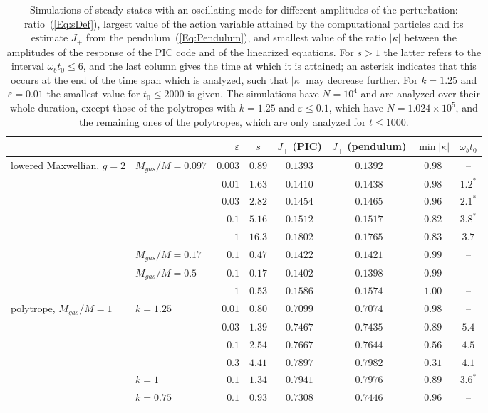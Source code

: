 \begin{table}[htp]
\begin{center}
\begin{tabular}{ll|rc|cc|cc}
\hline\hline
 & & $\varepsilon$ & $s$ & $J_+$ (PIC) & $J_+$ (pendulum) & $\min|\kappa|$ & $\omega_b t_0$ \\
\hline
lowered Maxwellian, $g = 2$ & $M_{gas}/M = 0.097$ & $0.003$ & $0.89$ & $0.1393$ & $0.1392$ & $0.98$ & -- \\
 & & $0.01$ & $1.63$ & $0.1410$ & $0.1438$ & $0.98$ & $1.2^*$ \\
 & & $0.03$ & $2.82$ & $0.1454$ & $0.1465$ & $0.96$ & $2.1^*$ \\
 & & $0.1$ & $5.16$ & $0.1512$ & $0.1517$ & $0.82$ & $3.8^*$ \\
 & & $1$ & $16.3$ & $0.1802$ & $0.1765$ & $0.83$ & $3.7$ \\
 & $M_{gas}/M = 0.17$ & $0.1$ & $0.47$ & $0.1422$ & $0.1421$ & $0.99$ & -- \\
 & $M_{gas}/M = 0.5$ & $0.1$ & $0.17$ & $0.1402$ & $0.1398$ & $0.99$ & -- \\
 & & $1$ & $0.53$ & $0.1586$ & $0.1574$ & $1.00$ & -- \\
\hline
polytrope, $M_{gas}/M = 1$ & $k = 1.25$ & $0.01$ & $0.80$ & $0.7099$ & $0.7074$ & $0.98$ & -- \\
 & & $0.03$ & $1.39$ & $0.7467$ & $0.7435$ & $0.89$ & $5.4$ \\
 & & $0.1$ & $2.54$ & $0.7667$ & $0.7644$ & $0.56$ & $4.5$ \\
 & & $0.3$ & $4.41$ & $0.7897$ & $0.7982$ & $0.31$ & $4.1$ \\
 & $k = 1$ & $0.1$ & $1.34$ & $0.7941$ & $0.7976$ & $0.89$ & $3.6^*$ \\
 & $k = 0.75$ & $0.1$ & $0.93$ & $0.7308$ & $0.7446$ & $0.96$ & -- \\
\hline\hline
\end{tabular}
\end{center}
\caption{Simulations of steady states with an oscillating mode for different amplitudes of the perturbation: ratio~(\ref{Eq:sDef}), largest value of the action variable attained by the computational particles and its estimate $J_+$ from the pendulum~(\ref{Eq:Pendulum}), and smallest value of the ratio $|\kappa|$ between the amplitudes of the response of the PIC code and of the linearized equations. For $s > 1$ the latter refers to the interval $\omega_b t_0\leq 6$, and the last column gives the time at which it is attained; an asterisk indicates that this occurs at the end of the time span which is analyzed, such that $|\kappa|$ may decrease further. For $k = 1.25$ and $\varepsilon = 0.01$ the smallest value for $t_0\leq 2000$ is given. The simulations have $N = 10^4$ and are analyzed over their whole duration, except those of the polytropes with $k = 1.25$ and $\varepsilon\leq 0.1$, which have $N = 1.024\times 10^5$, and the remaining ones of the polytropes, which are only analyzed for $t\leq 1000$.}
\label{Tab:TrappingRuns}
\end{table}

